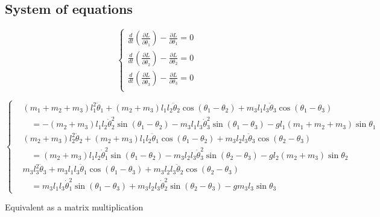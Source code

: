 \documentclass[11pt,a4paper]{article}
\begin{document}
\subsection{System of equations}

$$
\left\{
\begin{aligned}
\frac{d}{dt} \left( \frac{\partial L}{\partial \dot{\theta_1}} \right) - \frac{\partial L}{\partial \theta_1} = 0 \\[1em]
\frac{d}{dt} \left( \frac{\partial L}{\partial \dot{\theta_2}} \right) - \frac{\partial L}{\partial \theta_2} = 0 \\[1em]
\frac{d}{dt} \left( \frac{\partial L}{\partial \dot{\theta_3}} \right) - \frac{\partial L}{\partial \theta_3} = 0 \\[1em]
\end{aligned}
\right.
$$

$$
\left\{
\begin{aligned}
    &(m_1 + m_2 + m_3) l_1^2 \ddot{\theta}_1 + (m_2 + m_3) l_1 l_2 \ddot{\theta}_2 \cos(\theta_1 - \theta_2) + m_3 l_1 l_3 \ddot{\theta}_3 \cos(\theta_1 - \theta_3) \\
    &\quad = -(m_2 + m_3) l_1 l_2 \dot{\theta}_2^2 \sin(\theta_1 - \theta_2) - m_3 l_1 l_3 \dot{\theta}_3^2 \sin(\theta_1 - \theta_3) - g l_1 (m_1 + m_2 + m_3) \sin\theta_1 \\[1em]
    &(m_2 + m_3) l_2^2 \ddot{\theta}_2 + (m_2 + m_3) l_1 l_2 \ddot{\theta}_1 \cos(\theta_1 - \theta_2) + m_3 l_2 l_3 \ddot{\theta}_3 \cos(\theta_2 - \theta_3) \\
    &\quad = (m_2 + m_3) l_1 l_2 \dot{\theta}_1^2 \sin(\theta_1 - \theta_2) - m_3 l_2 l_3 \dot{\theta}_3^2 \sin(\theta_2 - \theta_3) - g l_2 (m_2 + m_3) \sin\theta_2 \\[1em]
    &m_3 l_3^2 \ddot{\theta}_3 + m_3 l_1 l_3 \ddot{\theta}_1 \cos(\theta_1 - \theta_3) + m_3 l_2 l_3 \ddot{\theta}_2 \cos(\theta_2 - \theta_3) \\
    &\quad = m_3 l_1 l_3 \dot{\theta}_1^2 \sin(\theta_1 - \theta_3) + m_3 l_2 l_3 \dot{\theta}_2^2 \sin(\theta_2 - \theta_3) - g m_3 l_3 \sin\theta_3
\end{aligned}
\right.
$$

Equivalent as a matrix multiplication
\end{document}
